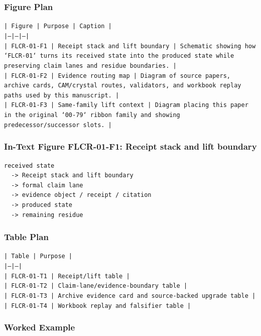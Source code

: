 \documentclass[11pt]{article}
\begin{document}
\subsubsection*{Figure Plan}

\noindent\texttt{| Figure | Purpose | Caption |}\\
\noindent\texttt{|---|---|---|}\\
\noindent\texttt{| FLCR-01-F1 | Receipt stack and lift boundary | Schematic showing how `FLCR-01` turns its received state into the produced state while preserving claim lanes and residue boundaries. |}\\
\noindent\texttt{| FLCR-01-F2 | Evidence routing map | Diagram of source papers, archive cards, CAM/crystal routes, validators, and workbook replay paths used by this manuscript. |}\\
\noindent\texttt{| FLCR-01-F3 | Same-family lift context | Diagram placing this paper in the original `00-79` ribbon family and showing predecessor/successor slots. |}\\

\subsubsection*{In-Text Figure FLCR-01-F1: Receipt stack and lift boundary}

\begin{verbatim}
received state
  -> Receipt stack and lift boundary
  -> formal claim lane
  -> evidence object / receipt / citation
  -> produced state
  -> remaining residue
\end{verbatim}

\subsubsection*{Table Plan}

\noindent\texttt{| Table | Purpose |}\\
\noindent\texttt{|---|---|}\\
\noindent\texttt{| FLCR-01-T1 | Receipt/lift table |}\\
\noindent\texttt{| FLCR-01-T2 | Claim-lane/evidence-boundary table |}\\
\noindent\texttt{| FLCR-01-T3 | Archive evidence card and source-backed upgrade table |}\\
\noindent\texttt{| FLCR-01-T4 | Workbook replay and falsifier table |}\\

\subsubsection*{Worked Example}
\end{document}
